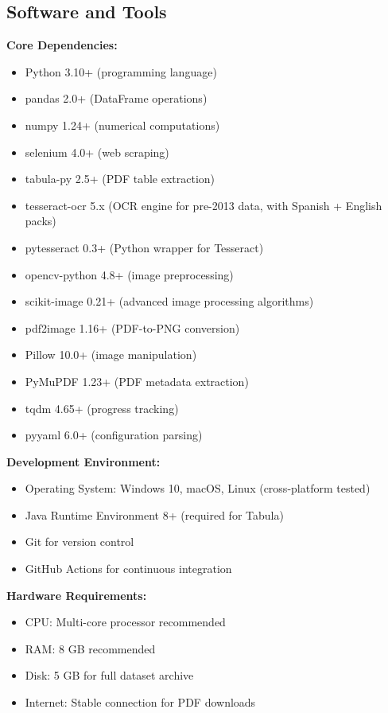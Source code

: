 \documentclass[12pt]{article}
\begin{document}
\subsection*{Software and Tools}

\textbf{Core Dependencies:}
\begin{itemize}
\item Python 3.10+ (programming language)
\item pandas 2.0+ (DataFrame operations)
\item numpy 1.24+ (numerical computations)
\item selenium 4.0+ (web scraping)
\item tabula-py 2.5+ (PDF table extraction)
\item tesseract-ocr 5.x (OCR engine for pre-2013 data, with Spanish + English packs)
\item pytesseract 0.3+ (Python wrapper for Tesseract)
\item opencv-python 4.8+ (image preprocessing)
\item scikit-image 0.21+ (advanced image processing algorithms)
\item pdf2image 1.16+ (PDF-to-PNG conversion)
\item Pillow 10.0+ (image manipulation)
\item PyMuPDF 1.23+ (PDF metadata extraction)
\item tqdm 4.65+ (progress tracking)
\item pyyaml 6.0+ (configuration parsing)
\end{itemize}

\textbf{Development Environment:}
\begin{itemize}
\item Operating System: Windows 10, macOS, Linux (cross-platform tested)
\item Java Runtime Environment 8+ (required for Tabula)
\item Git for version control
\item GitHub Actions for continuous integration
\end{itemize}

\textbf{Hardware Requirements:}
\begin{itemize}
\item CPU: Multi-core processor recommended
\item RAM: 8 GB recommended
\item Disk: 5 GB for full dataset archive
\item Internet: Stable connection for PDF downloads
\end{itemize}
\end{document}
